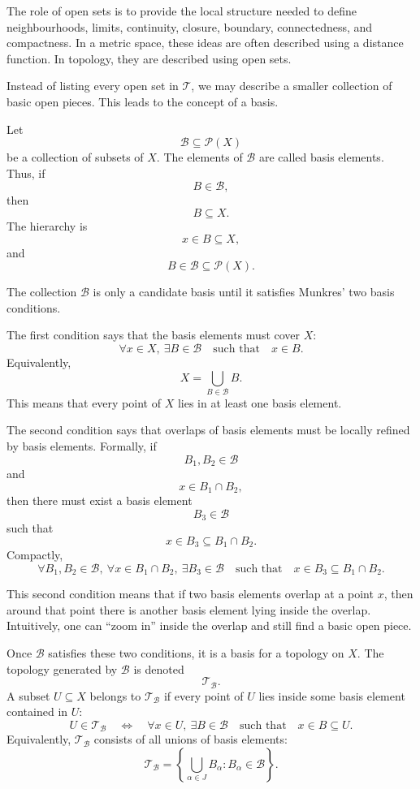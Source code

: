 \documentclass{article}
\begin{document}
	The role of open sets is to provide the local structure needed to define neighbourhoods, limits, continuity, closure, boundary, connectedness, and compactness. In a metric space, these ideas are often described using a distance function. In topology, they are described using open sets.
	
	Instead of listing every open set in \(\mathcal T\), we may describe a smaller collection of basic open pieces. This leads to the concept of a basis.
	
	Let
	$$
	\mathcal B\subseteq\mathcal P(X)
	$$
	be a collection of subsets of \(X\). The elements of \(\mathcal B\) are called basis elements. Thus, if
	$$
	B\in\mathcal B,
	$$
	then
	$$
	B\subseteq X.
	$$
	The hierarchy is
	$$
	x\in B\subseteq X,
	$$
	and
	$$
	B\in\mathcal B\subseteq\mathcal P(X).
	$$
	
	The collection \(\mathcal B\) is only a candidate basis until it satisfies Munkres' two basis conditions.
	
	The first condition says that the basis elements must cover \(X\):
	$$
	\forall x\in X,\ \exists B\in\mathcal B
	\quad\text{such that}\quad
	x\in B.
	$$
	Equivalently,
	$$
	X=\bigcup_{B\in\mathcal B}B.
	$$
	This means that every point of \(X\) lies in at least one basis element.
	
	The second condition says that overlaps of basis elements must be locally refined by basis elements. Formally, if
	$$
	B_1,B_2\in\mathcal B
	$$
	and
	$$
	x\in B_1\cap B_2,
	$$
	then there must exist a basis element
	$$
	B_3\in\mathcal B
	$$
	such that
	$$
	x\in B_3\subseteq B_1\cap B_2.
	$$
	Compactly,
	$$
	\forall B_1,B_2\in\mathcal B,\ \forall x\in B_1\cap B_2,\ 
	\exists B_3\in\mathcal B
	\quad\text{such that}\quad
	x\in B_3\subseteq B_1\cap B_2.
	$$
	
	This second condition means that if two basis elements overlap at a point \(x\), then around that point there is another basis element lying inside the overlap. Intuitively, one can ``zoom in'' inside the overlap and still find a basic open piece.
	
	Once \(\mathcal B\) satisfies these two conditions, it is a basis for a topology on \(X\). The topology generated by \(\mathcal B\) is denoted
	$$
	\mathcal T_{\mathcal B}.
	$$
	A subset \(U\subseteq X\) belongs to \(\mathcal T_{\mathcal B}\) if every point of \(U\) lies inside some basis element contained in \(U\):
	$$
	U\in\mathcal T_{\mathcal B}
	\quad\Longleftrightarrow\quad
	\forall x\in U,\ \exists B\in\mathcal B
	\quad\text{such that}\quad
	x\in B\subseteq U.
	$$
	Equivalently, \(\mathcal T_{\mathcal B}\) consists of all unions of basis elements:
	$$
	\mathcal T_{\mathcal B}
	=
	\left\{
	\bigcup_{\alpha\in J}B_\alpha:
	B_\alpha\in\mathcal B
	\right\}.
	$$
	
\end{document}
